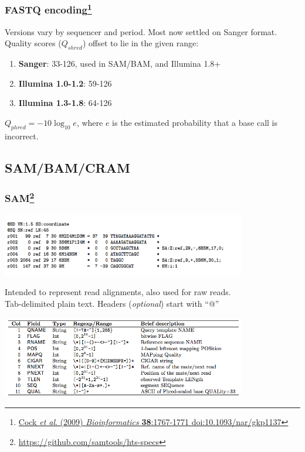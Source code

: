 \begin{frame}[fragile]
  \frametitle{FASTQ encoding\footnote{\tiny{\href{http://dx.doi.org/10.1093/nar/gkp1137}{Cock \textit{et al}. (2009) \textit{Bioinformatics} \textbf{38}:1767-1771 doi:10.1093/nar/gkp1137}}}}
  Versions vary by sequencer and period. Most now settled on Sanger format. \\
  Quality scores ($Q_{shred}$) offset to lie in the given range:
  \begin{enumerate}
    \item \textbf{Sanger}: 33-126, used in SAM/BAM, and Illumina 1.8+
    \item \textbf{Illumina 1.0-1.2}: 59-126
    \item \textbf{Illumina 1.3-1.8}: 64-126
  \end{enumerate}
  $Q_{phred} = -10 \log_{10}e$, where $e$ is the estimated probability that a base call is incorrect.
\end{frame}

\subsection{SAM/BAM/CRAM}

\begin{frame}[fragile]
  \frametitle{SAM\footnote{\tiny{\href{http://samtools.github.io/hts-specs/SAMv1.pdf}{https://github.com/samtools/hts-specs}}}}
  \begin{center}
    \includegraphics[width=0.8\textwidth]{images/sam_format}
  \end{center}  
  Intended to represent read alignments, also used for raw reads. \\
  Tab-delimited plain text. Headers (\textit{optional}) start with ``@'' \\
  \begin{center}
    \includegraphics[width=0.8\textwidth]{images/sam_columns}
  \end{center}  
\end{frame}

